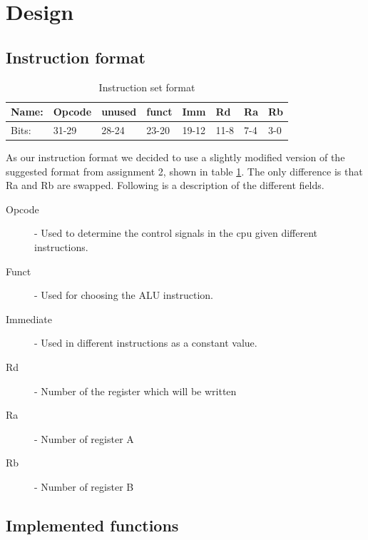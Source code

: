 \documentclass[11pt]{report}
\begin{document}
\section*{Design}

\subsection*{Instruction format}

\begin{table}[h]
  \centering
  \begin{tabular}{|l|l|l|l|l|l|l|l|}
    \hline
    Name: 		&	Opcode		&	unused	&	funct	&	Imm		&	Rd		&	Ra	&	Rb	\\\hline
    Bits: 		&	31-29		&	28-24	&	23-20	&	19-12	&	11-8	&	7-4	&	3-0	\\\hline
  \end{tabular}
  \caption{Instruction set format}
  \label{tab:instformat}
\end{table}

As our instruction format we decided to use a slightly modified version of the
suggested format from assignment 2, shown in table \ref{tab:instformat}. The only
difference is that Ra and Rb are swapped. Following is a description of the different
fields.

\begin{description}
\item[Opcode] - Used to determine the control signals in the cpu given different instructions.	
\item[Funct] - Used for choosing the ALU instruction.
\item[Immediate] - Used in different instructions as a constant value.
\item[Rd] - Number of the register which will be written
\item[Ra] - Number of register A
\item[Rb] - Number of register B
\end{description}



\subsection*{Implemented functions}
\end{document}
